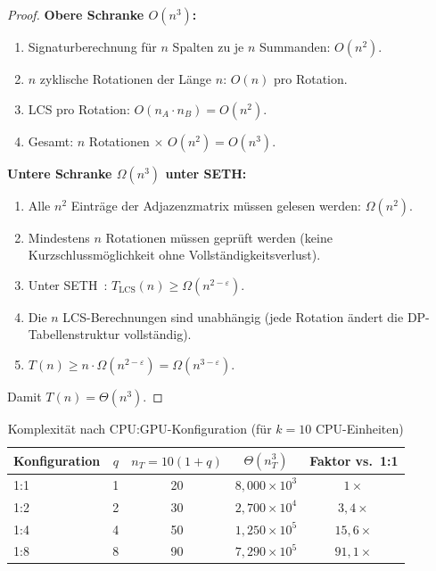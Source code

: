 ﻿\documentclass[a4paper,12pt]{article}
\theoremstyle{definition}
\begin{document}
\begin{proof}
  \textbf{Obere Schranke $O(n^3)$:}
  \begin{enumerate}
    \item Signaturberechnung f\"{u}r $n$ Spalten zu je $n$ Summanden: $O(n^2)$.
    \item $n$ zyklische Rotationen der L\"{a}nge $n$: $O(n)$ pro Rotation.
    \item LCS pro Rotation: $O(n_A \cdot n_B) = O(n^2)$.
    \item Gesamt: $n$ Rotationen $\times$ $O(n^2) = O(n^3)$.
  \end{enumerate}
  \textbf{Untere Schranke $\Omega(n^3)$ unter SETH:}
  \begin{enumerate}
    \item Alle $n^2$ Eintr\"{a}ge der Adjazenzmatrix m\"{u}ssen gelesen werden: $\Omega(n^2)$.
    \item Mindestens $n$ Rotationen m\"{u}ssen gepr\"{u}ft werden (keine Kurzschlussm\"{o}glichkeit ohne Vollst\"{a}ndigkeitsverlust).
    \item Unter SETH~\cite{abboud2015tight}: $T_{\mathrm{LCS}}(n) \geq \Omega(n^{2-\varepsilon})$.
    \item Die $n$ LCS-Berechnungen sind unabh\"{a}ngig (jede Rotation \"{a}ndert die DP-Tabellenstruktur vollst\"{a}ndig).
    \item $T(n) \geq n \cdot \Omega(n^{2-\varepsilon}) = \Omega(n^{3-\varepsilon})$.
  \end{enumerate}
  Damit $T(n) = \Theta(n^3)$.
\end{proof}

\begin{table}[H]
  \centering
  \caption{Komplexit\"{a}t nach CPU:GPU-Konfiguration (f\"{u}r $k=10$ CPU-Einheiten)}
  \label{tab:komplex_q}
  \begin{tabular}{l|c|c|c|c}
    \toprule
    Konfiguration & $q$ & $n_T = 10(1+q)$ & $\Theta(n_T^3)$ & Faktor vs.\ 1:1 \\
    \midrule
    1:1 & 1 & 20  & $8{,}000 \times 10^3$ & $1\times$ \\
    1:2 & 2 & 30  & $2{,}700 \times 10^4$ & $3{,}4\times$ \\
    1:4 & 4 & 50  & $1{,}250 \times 10^5$ & $15{,}6\times$ \\
    1:8 & 8 & 90  & $7{,}290 \times 10^5$ & $91{,}1\times$ \\
    \bottomrule
  \end{tabular}
\end{table}
\end{document}
